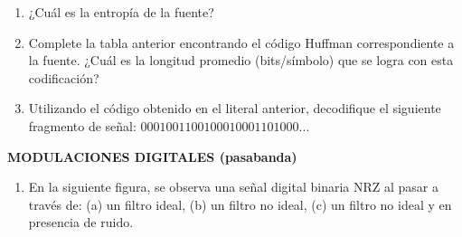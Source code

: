 \begin{enumerate}
\begin{enumerate}
\begin{table}[h]
\captionsetup{justification = raggedright,singlelinecheck = false}
\caption{Ejercicio E}
\label{tabla:tabla19}
	\centering
\end{table}

\begin{enumerate}
	\item ¿Cuál es la entropía de la fuente? 
	
	\item Complete la tabla anterior encontrando el código Huffman correspondiente a la fuente. ¿Cuál es la longitud promedio (bits/símbolo) que se logra con esta codificación? 
	
	\item Utilizando el código obtenido en el literal anterior, decodifique el siguiente fragmento de señal: $0001001100100010001101000...$
	
\end{enumerate}


	\end{enumerate}
\newpage


\begin{center}
	\textbf{MODULACIONES DIGITALES (pasabanda)}
	\\
	
\end{center}



\begin{enumerate}
	\item En la siguiente figura, se observa una señal digital binaria NRZ al pasar a través de: (a) un filtro ideal, (b) un filtro no ideal, (c) un filtro no ideal y en presencia de ruido.
	
	



\end{enumerate}
\end{enumerate}
